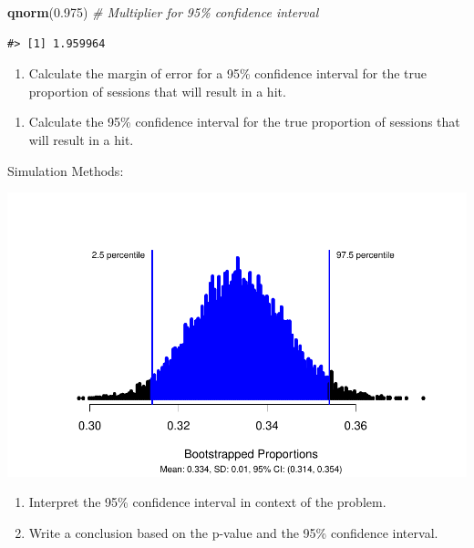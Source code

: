 \documentclass[
]{report}
\newenvironment{Shaded}{\begin{snugshade}}{\end{snugshade}}
\newcommand{\CommentTok}[1]{\textcolor[rgb]{0.56,0.35,0.01}{\textit{#1}}}
\newcommand{\FloatTok}[1]{\textcolor[rgb]{0.00,0.00,0.81}{#1}}
\newcommand{\FunctionTok}[1]{\textcolor[rgb]{0.13,0.29,0.53}{\textbf{#1}}}
\newcommand{\NormalTok}[1]{#1}
\providecommand{\tightlist}{%
  \setlength{\itemsep}{0pt}\setlength{\parskip}{0pt}}
\begin{document}
\begin{Shaded}
\begin{Highlighting}[]
\FunctionTok{qnorm}\NormalTok{(}\FloatTok{0.975}\NormalTok{) }\CommentTok{\# Multiplier for 95\% confidence interval}
\end{Highlighting}
\end{Shaded}

\begin{verbatim}
#> [1] 1.959964
\end{verbatim}

\begin{enumerate}
\def\labelenumi{\arabic{enumi}.}
\setcounter{enumi}{11}
\tightlist
\item
  Calculate the margin of error for a 95\% confidence interval for the true proportion of sessions that will result in a hit.
\end{enumerate}

\vspace{0.6in}

\begin{enumerate}
\def\labelenumi{\arabic{enumi}.}
\setcounter{enumi}{12}
\tightlist
\item
  Calculate the 95\% confidence interval for the true proportion of sessions that will result in a hit.
\end{enumerate}

\vspace{1in}

\newpage

Simulation Methods:

\begin{center}\includegraphics[width=0.85\linewidth]{05-UR-module4_review_files/figure-latex/unnamed-chunk-4-1} \end{center}

\begin{enumerate}
\def\labelenumi{\arabic{enumi}.}
\setcounter{enumi}{13}
\item
  Interpret the 95\% confidence interval in context of the problem.
  \vspace{0.6in}
\item
  Write a conclusion based on the p-value and the 95\% confidence interval.
\end{enumerate}
\end{document}
